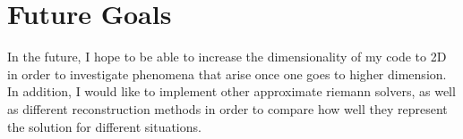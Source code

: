 \section{ Future Goals}

In the future, I hope to be able to increase the dimensionality of my code to 2D
in order to investigate phenomena that arise once one goes to higher dimension. In addition, I would like to implement other approximate riemann solvers, as well as different reconstruction methods in order to compare how well they represent the solution for different situations.
